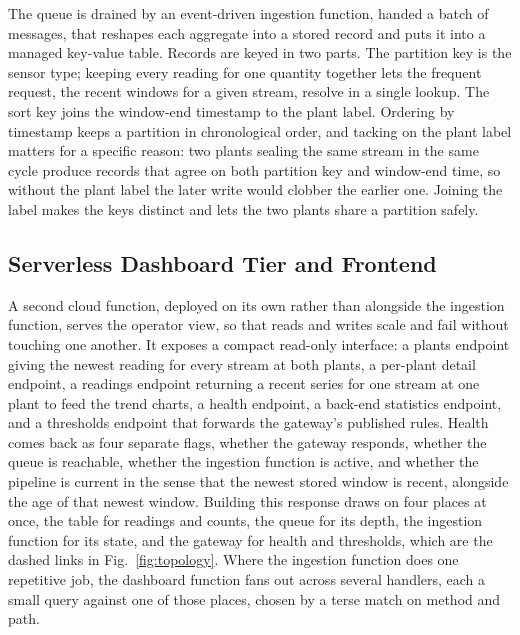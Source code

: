 \documentclass[conference]{IEEEtran}
\begin{document}
The queue is drained by an event-driven ingestion function, handed a batch of messages, that reshapes each aggregate into a stored record and puts it into a managed key-value table. Records are keyed in two parts. The partition key is the sensor type; keeping every reading for one quantity together lets the frequent request, the recent windows for a given stream, resolve in a single lookup. The sort key joins the window-end timestamp to the plant label. Ordering by timestamp keeps a partition in chronological order, and tacking on the plant label matters for a specific reason: two plants sealing the same stream in the same cycle produce records that agree on both partition key and window-end time, so without the plant label the later write would clobber the earlier one. Joining the label makes the keys distinct and lets the two plants share a partition safely.

\subsection{Serverless Dashboard Tier and Frontend}

A second cloud function, deployed on its own rather than alongside the ingestion function, serves the operator view, so that reads and writes scale and fail without touching one another. It exposes a compact read-only interface: a plants endpoint giving the newest reading for every stream at both plants, a per-plant detail endpoint, a readings endpoint returning a recent series for one stream at one plant to feed the trend charts, a health endpoint, a back-end statistics endpoint, and a thresholds endpoint that forwards the gateway's published rules. Health comes back as four separate flags, whether the gateway responds, whether the queue is reachable, whether the ingestion function is active, and whether the pipeline is current in the sense that the newest stored window is recent, alongside the age of that newest window. Building this response draws on four places at once, the table for readings and counts, the queue for its depth, the ingestion function for its state, and the gateway for health and thresholds, which are the dashed links in Fig.~\ref{fig:topology}. Where the ingestion function does one repetitive job, the dashboard function fans out across several handlers, each a small query against one of those places, chosen by a terse match on method and path.
\end{document}

